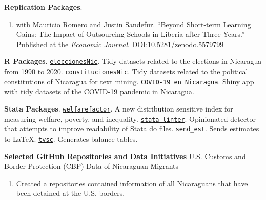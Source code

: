 \documentclass[a4paper, 10pt]{article}
\renewenvironment{itemize}{
  \begin{list}{}
    { \setlength{\itemsep}{5pt}
      \setlength{\parsep}{0pt}
      \setlength{\topsep}{0pt}
      \setlength{\leftmargin}{0em} } }{
  \end{list}}
\begin{document}
\begin{itemize}
  \item \textbf{Replication Packages}.
  \begin{enumerate}[leftmargin=10pt, label={}, itemindent=-10pt, nosep]
    \item with Mauricio Romero and Justin Sandefur. ``Beyond Short-term Learning Gains: The Impact of Outsourcing Schools in Liberia after Three Years.'' Published at the \textit{Economic Journal}. DOI:\href{https://doi.org/10.5281/zenodo.5579799}{10.5281/zenodo.5579799}
  \end{enumerate}
  \item \textbf{R Packages}. \newline \texttt{\href{https://github.com/RRMaximiliano/eleccionesNic}{eleccionesNic}}. Tidy datasets related to the elections in Nicaragua from 1990 to 2020. \newline \texttt{\href{https://github.com/RRMaximiliano/constitucionesNic}{constitucionesNic}}. Tidy datasets related to the political constitutions of Nicaragua for text mining. \newline \texttt{\href{https://rrmaximiliano.shinyapps.io/covid-nicaragua/}{COVID-19 en Nicaragua}}. Shiny app with tidy datasets of the COVID-19 pandemic in Nicaragua.
  \item \textbf{Stata Packages}. \newline
  \texttt{\href{https://github.com/RRMaximiliano/welfarefactor}{welfarefactor}}.
  A new distribution sensitive index for measuring welfare, poverty, and
  inequality.
  \newline \texttt{\href{https://github.com/worldbank/stata-linter}
  {stata\_linter}}. Opinionated detector that attempts to improve readability of Stata do files. \newline \texttt{\href{https://github.com/RRMaximiliano/send\_est}{send\_est}}. Sends estimates to \LaTeX. \newline \texttt{\href{https://github.com/RRMaximiliano/tvsc}{tvsc}}. Generates balance tables.
   \item \textbf{Selected GitHub Repositories and Data Initiatives}
   \newline U.S. Customs and Border Protection (CBP) Data of Nicaraguan Migrants \href{https://github.com/RRMaximiliano/migrants_usbp}{\faGithub}
   \begin{enumerate}[label = {-}]
    \item Created a repositories contained information of all Nicaraguans that have been detained at the U.S. borders.

\end{enumerate}
\end{itemize}
\end{document}
